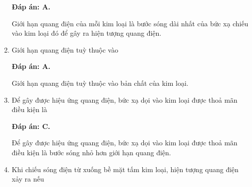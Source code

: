 \begin{enumerate}[label=\bfseries Câu \arabic*:]
	\loigiai
	{		\textbf{Đáp án: A.}
		
Giới hạn quang điện của mỗi kim loại là  bước sóng dài nhất của bức xạ chiếu vào kim loại đó để gây ra hiện tượng quang điện. 
		
	}
	
\item {} 
		\cauhoi
	{Giới hạn quang điện tuỳ thuộc vào
	}
	
	\loigiai
	{		\textbf{Đáp án: A.}
		
Giới hạn quang điện tuỳ thuộc vào bản chất của kim loại. 
		
	}
	
	\item {} 
		\cauhoi
	{Để gây được hiệu ứng quang điện, bức xạ dọi vào kim loại được thoả mãn điều kiện là 
	}
	
	\loigiai
	{		\textbf{Đáp án: C.}
		
Để gây được hiệu ứng quang điện, bức xạ dọi vào kim loại được thoả mãn điều kiện là bước sóng nhỏ hơn giới hạn quang điện. 
		
	}
	
	\item {} 
		\cauhoi
	{Khi chiếu sóng điện từ xuống bề mặt tấm kim loại, hiện tượng quang điện xảy ra nếu
	}
	

\end{enumerate}
